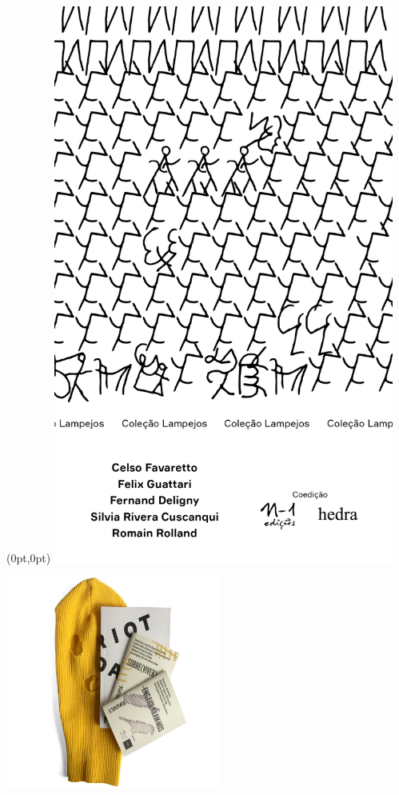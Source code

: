 \pagestyle{n-1}
\label{n-1}

\begin{textblock*}{5.625in}(0pt,0pt)%
\vspace*{-1.45cm}
\hspace*{-1.8cm}\includegraphics*[width=112mm]{./imgs/N-1.png}
\end{textblock*}

\pagebreak

\hspace{.5cm}

\begin{center}
\hspace*{-1cm}
\hspace*{1cm}\includegraphics[width=70mm]{./grid/riot.jpg}
\end{center}


